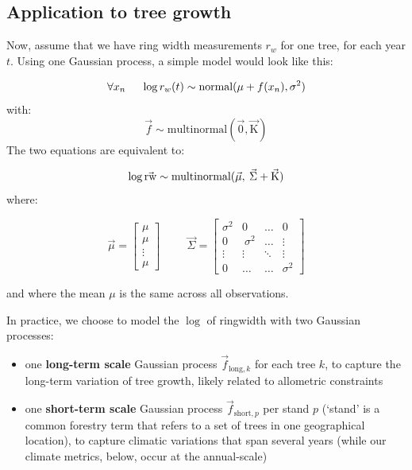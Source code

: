 \subsection{Application to tree growth}

Now, assume that we have ring width measurements $r_w$ for one tree, for each year $t$.
Using one Gaussian process, a simple model would look like this:

$$\forall x_n  \hspace{0.5cm} \log{r_w(t)} \sim \text{normal}(\mu + f(x_n), \sigma^2)$$
with:
$$\vec{f} \sim \text{multinormal}(\vec{0}, \vec{\mathrm{K}})$$
The two equations are equivalent to:

$$\log\vec{{\text{rw}}} \sim \text{multinormal}(\vec{\mu}, \hspace{0.08cm} \vec{\Sigma} + \vec{\mathrm{K}})$$
where:

$$
    \vec{\mu} = \begin{bmatrix}
               \mu \\
               \mu \\
               \vdots \\
               \mu
    \end{bmatrix}
    \hspace{1cm}
	\vec{\Sigma} = 
	\begin{bmatrix}
		\sigma^2  & 0 & \ldots & 0 \\
		0 & \ \sigma^2  & \ldots  & \vdots\\
		\vdots & \vdots & \ddots & \vdots \\
		0 & \ldots &  \ldots & \sigma^2 
	\end{bmatrix}
$$

\noindent and where the mean $\mu$ is the same across all observations.

\clearpage

\noindent In practice, we choose to model the $\log$ of ringwidth with two Gaussian processes:  
\begin{itemize}
    \item one \textbf{long-term scale} Gaussian process $\vec{f}_{\text{long},k}$ for each tree $k$, to capture the long-term variation of tree growth, likely related to allometric constraints   
    \item one \textbf{short-term scale} Gaussian process $\vec{f}_{\text{short},p}$ per stand $p$ (`stand' is a common forestry term that refers to a set of trees in one geographical location), to capture climatic variations that span several years (while our climate metrics, below, occur at the annual-scale)
\end{itemize}

